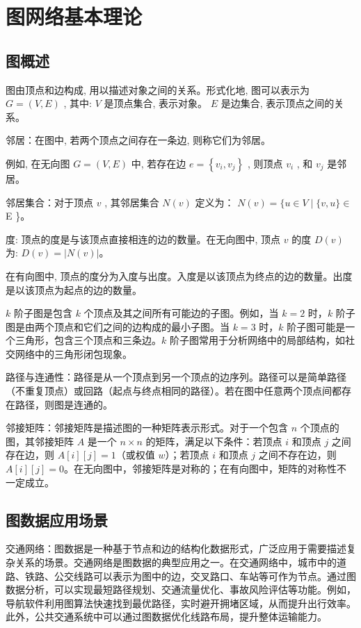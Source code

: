 
\chapter{图网络基本理论}
\section{图概述}
图由顶点和边构成, 用以描述对象之间的关系。形式化地, 图可以表示为 \( {G} = \left( {{V}, {E}}\right) \) , 其中: \( {V} \) 是顶点集合, 表示对象。 \( {E} \) 是边集合, 表示顶点之间的关系。

邻居：在图中, 若两个顶点之间存在一条边, 则称它们为邻居。

例如, 在无向图 \( G = \left( {V, E}\right) \) 中, 若存在边 \( e = \left\{  {{v}_i, {v}_j}\right\} \) , 则顶点 \( {v}_i \) , 和 \( {v}_j \) 是邻居。

邻居集合：对于顶点 \( v \) , 其邻居集合 \( N\left( v\right) \) 定义为： \( N\left( v\right)  = \{ u \in  V \mid  \{ v, u\}  \in \)
E \}。

度: 顶点的度是与该顶点直接相连的边的数量。在无向图中, 顶点 \( {v} \) 的度 \( D\left( {v}\right) \)
为: \( D\left( {v}\right)  = \left| {{N}\left( {v}\right) }\right| \)。

在有向图中, 顶点的度分为入度与出度。入度是以该顶点为终点的边的数量。出度是以该顶点为起点的边的数量。

$k$ 阶子图是包含 \(k\) 个顶点及其之间所有可能边的子图。例如，当 \(k = 2\) 时，$k$ 阶子图是由两个顶点和它们之间的边构成的最小子图。当 \(k = 3\) 时，$k$ 阶子图可能是一个三角形，包含三个顶点和三条边。$k$ 阶子图常用于分析网络中的局部结构，如社交网络中的三角形闭包现象。

路径与连通性：路径是从一个顶点到另一个顶点的边序列。路径可以是简单路径（不重复顶点）或回路（起点与终点相同的路径）。若在图中任意两个顶点间都存在路径，则图是连通的。

邻接矩阵：邻接矩阵是描述图的一种矩阵表示形式。对于一个包含 \(n\) 个顶点的图，其邻接矩阵 $A$ 是一个 \(n\times n\) 的矩阵，满足以下条件：若顶点 \(i\) 和顶点 \(j\) 之间存在边，则 \(A[i][j]=1\)（或权值 \(w\)）；若顶点 \(i\) 和顶点 \(j\) 之间不存在边，则 \(A[i][j]=0\)。在无向图中，邻接矩阵是对称的；在有向图中，矩阵的对称性不一定成立。


\section{图数据应用场景}
交通网络：图数据是一种基于节点和边的结构化数据形式，广泛应用于需要描述复杂关系的场景。交通网络是图数据的典型应用之一。在交通网络中，城市中的道路、铁路、公交线路可以表示为图中的边，交叉路口、车站等可作为节点。通过图数据分析，可以实现最短路径规划、交通流量优化、事故风险评估等功能。例如，导航软件利用图算法快速找到最优路径，实时避开拥堵区域，从而提升出行效率。此外，公共交通系统中可以通过图数据优化线路布局，提升整体运输能力。

